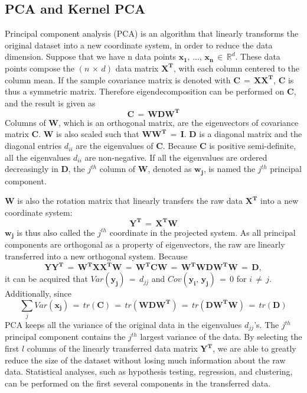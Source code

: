 \documentclass[12pt]{article}
\numberwithin{equation}{section}
\numberwithin{table}{section}
\numberwithin{figure}{section}
\begin{document}
\subsection{PCA and Kernel PCA} \label{pca}
\hspace{12 pt}
Principal component analysis (PCA) is an algorithm that linearly transforms
the original dataset into a new coordinate system, in order to reduce
the data dimension. Suppose that we have n data points 
$\mathbf{x_{1}},\,...,\,\mathbf{x_{n}}\,\in\,\mathbb{R}^{d}$.
These data points compose the $(n\,\times\, d)$ data matrix $\mathbf{X^{T}}$,
with each column centered to the column mean. If the sample covariance
matrix is denoted with $\mathbf{C}\,=\,\mathbf{XX^{T}}$, $\mathbf{C}$
is thus a symmetric matrix. Therefore eigendecomposition can be performed
on $\mathbf{C}$, and the result is given as
\[
\mathbf{C}\,=\,\mathbf{WDW^{T}}
\]
Columns of $\mathbf{W}$, which is an orthogonal matrix, are the eigenvectors
of covariance matrix $\mathbf{C}$. $\mathbf{W}$ is also scaled such
that $\mathbf{WW^{T}}\,=\,\mathbf{I}$. $\mathbf{D}$ is a diagonal
matrix and the diagonal entries $d_{ii}$ are the eigenvalues of $\mathbf{C}$.
Because $\mathbf{C}$ is positive semi-definite, all the eigenvalues
$d_{ii}$ are non-negative. If all the eigenvalues are ordered decreasingly
in $\mathbf{D}$, the $j^{th}$ column of $\mathbf{W}$, denoted as
$\mathbf{w_{j}}$, is named the $j^{th}$ principal component.

$\mathbf{W}$ is also the rotation matrix that linearly transfers
the raw data $\mathbf{X^{T}}$ into a new coordinate system:
\[
\mathbf{Y^{T}}\,=\,\mathbf{X^{T}W}
\]
$\mathbf{w_{j}}$ is thus also called the $j^{th}$ coordinate in
the projected system. As all principal components are orthogonal as
a property of eigenvectors, the raw are linearly transferred into
a new orthogonal system. Because 
\[
\mathbf{YY^{T}\,=\,\mathbf{W^{T}XX^{T}W}\,=\,\mathbf{W^{T}CW}}\,=\,\mathbf{W^{T}WDW^{T}W}\,=\,\mathbf{D},
\]
it can be acquired that $Var(\mathbf{y_{j}})\,=\, d_{jj}$ and 
$Cov(\mathbf{y_{i}},\,\mathbf{y_{j}})\,=\,0$
for $i\,\neq\, j$. Additionally, since 
\[
\sum_{j}Var(\mathbf{x_{j}})\,=\, tr(\mathbf{C})\,=\, tr(\mathbf{WDW^{T}})\,=\, tr(\mathbf{DW^{T}W})\,=\, tr(\mathbf{D})
\]
PCA keeps all the variance of the original data in the eigenvalues
$d_{jj}$'s. The $j^{th}$ principal component contains the $j^{th}$
largest variance of the data. By selecting the first $l$ columns
of the linearly transferred data matrix $\mathbf{Y^{T}}$, we are
able to greatly reduce the size of the dataset without losing much
information about the raw data. Statistical analyses, such as hypothesis
testing, regression, and clustering, can be performed on the first
several components in the transferred data.
\end{document}
